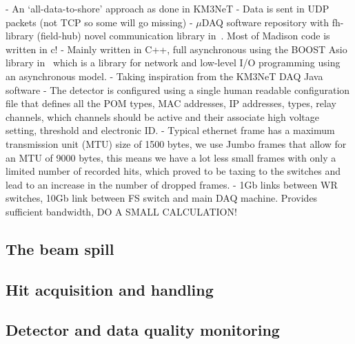 - An `all-data-to-shore' approach as done in KM3NeT
- Data is sent in UDP packets (not TCP so some will go missing)
- $\mu$DAQ software repository with fh-library (field-hub) novel communication library
in~\cite{microdaq2020}. Most of Madison code is written in c!
- Mainly written in C++, full asynchronous using the BOOST Asio library in~\cite{boost2020} which
is a library for network and low-level I/O programming using an asynchronous model.
- Taking inspiration from the KM3NeT DAQ Java software
- The detector is configured using a single human readable configuration file that defines all the
POM types, MAC addresses, IP addresses, types, relay channels, which channels should be active and
their associate high voltage setting, threshold and electronic ID.
- Typical ethernet frame has a maximum transmission unit (MTU) size of 1500 bytes, we use Jumbo
frames that allow for an MTU of 9000 bytes, this means we have a lot less small frames with only a
limited number of recorded hits, which proved to be taxing to the switches and lead to an increase
in the number of dropped frames.
- 1Gb links between WR switches, 10Gb link between FS switch and main DAQ machine. Provides
sufficient bandwidth, DO A SMALL CALCULATION!

\subsection{The beam spill} %
\label{sec:daq_soft_spill} %

\subsection{Hit acquisition and handling} %
\label{sec:daq_soft_hits} %

\subsection{Detector and data quality monitoring} %
\label{sec:daq_soft_monitor} %

